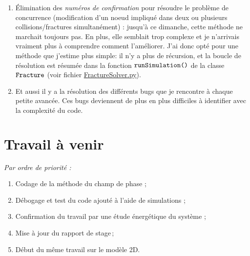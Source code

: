 \documentclass[
  french,
	11pt, %
]{fphw}
\begin{document}
\begin{enumerate}
  \item Élimination des \emph{numéros de confirmation} pour résoudre le problème de concurrence (modification d'un noeud impliqué dans deux ou plusieurs collisions/fractures simultanément) : jusqu'à ce dimanche, cette méthode ne marchait toujours pas. En plus, elle semblait trop complexe et je n'arrivais vraiment plus à comprendre comment l'améliorer. J'ai donc opté pour une méthode que j'estime plus simple: il n'y a plus de récursion, et la boucle de résolution est résumée dans la fonction $\verb|runSimulation()|$ de la classe $\verb|Fracture|$ (voir fichier \href{https://github.com/desmond-rn/ice-floes/blob/master/code/simu1D/FractureSolver.py}{FractureSolver.py}).
  \item Et aussi il y a la résolution des différents bugs que je rencontre à chaque petite avancée. Ces bugs deviennent de plus en plus difficiles à identifier avec la complexité du code.
\end{enumerate} 





\section*{Travail à venir}

\emph{Par ordre de priorité :}

\begin{enumerate}
  \item Codage de la méthode du champ de phase ;
  \item Débogage et test du code ajouté à l'aide de simulations ;
  \item Confirmation du travail par une étude énergétique du système ;
  \item Mise à jour du rapport de stage ;
  \item Début du même travail sur le modèle 2D.
\end{enumerate}



\clearpage   %
\printbibliography
\end{document}
